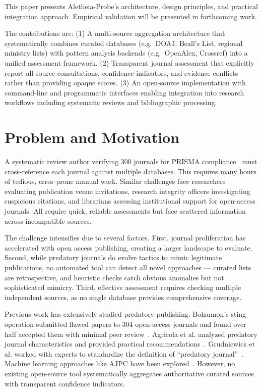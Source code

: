 \documentclass[fleqn,10pt]{SelfArx}
\begin{document}
This paper presents Aletheia-Probe's architecture, design principles,
and practical integration approach. Empirical validation will be
presented in forthcoming work.

The contributions are: (1) A multi-source aggregation architecture
that systematically combines curated databases (e.g.~DOAJ, Beall's
List, regional ministry lists) with pattern analysis backends
(e.g.~OpenAlex, Crossref) into a unified assessment framework. (2)
Transparent journal assessment that explicitly report all source
consultations, confidence indicators, and evidence conflicts rather
than providing opaque scores. (3) An open-source implementation with
command-line and programmatic interfaces enabling integration into
research workflows including systematic reviews and bibliographic
processing.

\section{Problem and Motivation}

A systematic review author verifying 300 journals for PRISMA
compliance~\cite{page2021prisma} must cross-reference each journal
against multiple databases. This requires many hours of tedious,
error-prone manual work. Similar challenges face researchers
evaluating publication venue invitations, research integrity officers
investigating suspicious citations, and librarians assessing
institutional support for open-access journals. All require quick,
reliable assessments but face scattered information across
incompatible sources.

The challenge intensifies due to several factors. First, journal
proliferation has accelerated with open access publishing, creating a
larger landscape to evaluate. Second, while predatory journals do
evolve tactics to mimic legitimate publications, no automated tool can
detect all novel approaches --- curated lists are retrospective, and
heuristic checks catch obvious anomalies but not sophisticated
mimicry. Third, effective assessment requires checking multiple
independent sources, as no single database provides comprehensive
coverage.

Previous work has extensively studied predatory publishing. Bohannon's
sting operation submitted flawed papers to 304 open-access journals
and found over half accepted them with minimal peer
review~\cite{bohannon2013garbage}. Agricola et al. analyzed predatory
journal characteristics and provided practical
recommendations~\cite{agricola2025}. Grudniewicz et al. worked with
experts to standardize the definition of ``predatory
journal''~\cite{grudniewicz2019predatory}. Machine learning approaches
like AJPC have been explored~\cite{chen2023ajpc}. However, no existing
open-source tool systematically aggregates authoritative curated
sources with transparent confidence indicators.
\end{document}
